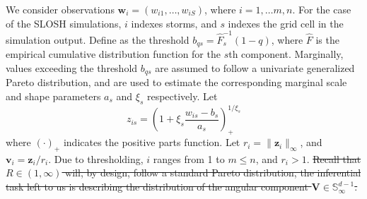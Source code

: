 We consider observations $\bm{w}_{i} = (w_{i1}, \ldots , w_{iS})$, where 
    $i =1 ,\ldots m ,n$. For the case of the SLOSH simulations, $i$ indexes 
    storms, and $s$ indexes the grid cell in the simulation output.
    Define as the threshold $b_{qs} = \hat{F}_{s}^{-1}(1 - q)$, where $\hat{F}$ is
    the empirical cumulative distribution function for the $s$th component.
    Marginally, values exceeding the threshold $b_{qs}$ are assumed to follow
    a univariate generalized Pareto distribution, and are used to estimate the
    corresponding marginal scale and shape parameters $a_{s}$ and $\xi_{s}$
    respectively.  Let
    \begin{equation}
        \label{eqn:standardization}
        z_{is} = \left(1 + \xi_{s}\frac{w_{is} 
            - b_{s}}{a_{s}}\right)_{+}^{1 / \xi_{s}}
    \end{equation}
    where $(\cdot)_+$ indicates the positive parts function.  Let 
    $r_i = \lVert \bm{z}_i\rVert_{\infty}$, and $\bm{v}_i = \bm{z}_i / r_i$.  Due to 
    thresholding, $i$ ranges from 1 to $m\leq n$, and $r_i > 1$.  \st{Recall that
    $R\in (1, \infty)$ will, by design, follow a standard Pareto distribution,
    the inferential task left to us is describing the distribution of the
    angular component $\bm{V}\in\mathbb{S}_{\infty}^{d-1}$.  } 

